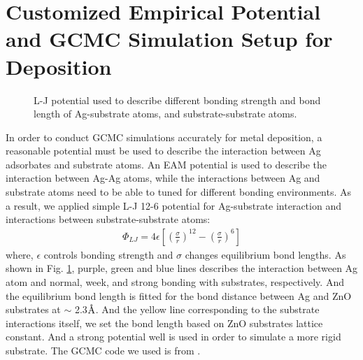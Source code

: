 \section{Customized Empirical Potential and GCMC Simulation Setup for Deposition}

\begingroup
\begin{figure}[!ht]
  \centering
  \caption[Lennard-Jones potential used to describe different bonding strength and bond length of Ag-substrate atoms, and substrate-substrate atoms]{\ac{L-J} potential used to describe different bonding strength and bond length of Ag-substrate atoms, and substrate-substrate atoms.}
  \label{Chap:Ag/ZnO:fig2}
\end{figure}
\endgroup

In order to conduct \ac{GCMC} simulations accurately for metal deposition, a reasonable potential must be used to describe the interaction between Ag adsorbates and substrate atoms. An \ac{EAM} potential \cite{williams2016modeling} is used to describe the interaction between Ag-Ag atoms, while the interactions between Ag and substrate atoms need to be able to tuned for different bonding environments. As a result, we applied simple \ac{L-J} 12-6 potential \cite{jones1924determination} for Ag-substrate interaction and interactions between substrate-substrate atoms:
\begin{align}
 \Phi_{LJ} = 4\epsilon \left[ (\frac{\sigma}{r})^{12} - (\frac{\sigma}{r})^6\right]
 \label{Chap:Ag/ZnO:eq:LJ}
\end{align}
where, $\epsilon$ controls bonding strength and $\sigma$ changes equilibrium bond lengths. As shown in Fig. \ref{Chap:Ag/ZnO:fig2}, purple, green and blue lines describes the interaction between Ag atom and normal, week, and strong bonding with substrates, respectively. And the equilibrium bond length is fitted for the bond distance between Ag and ZnO substrates at $\sim$ 2.3$\mbox{\normalfont\AA}$. And the yellow line corresponding to the substrate interactions itself, we set the bond length based on ZnO substrates lattice constant. And a strong potential well is used in order to simulate a more rigid substrate. The \ac{GCMC} code we used is from \cite{sina2017mapp}.

